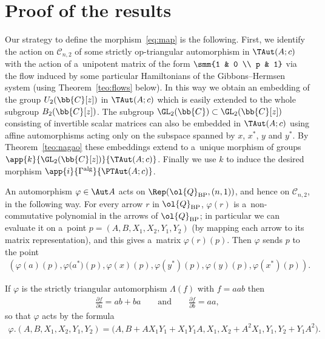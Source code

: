 \section{Proof of the results}

Our strategy to def\/ine the morphism~\eqref{eq:map} is the following.
First, we identify the action on \(\mathcal{C}_{n,2}\) of some strictly op-triangular automorphism in
\(\TAut(A;c)\) with the action of a~unipotent matrix of the form \(\smm{1 & 0
\\ %
p & 1}\) via the f\/low induced by some particular Hamiltonians of the Gibbons--Hermsen system (using
Theorem~\ref{teo:flows} below).
In this way we obtain an embedding of the group \(U_{2}(\bb{C}[z])\) in \(\TAut(A;c)\) which is easily
extended to the whole subgroup \(B_{2}(\bb{C}[z])\).
The subgroup \(\GL_{2}(\bb{C})\subset \GL_{2}(\bb{C}[z])\) consisting of invertible scalar matrices can
also be embedded in \(\TAut(A;c)\) using af\/f\/ine automorphisms acting only on the subspace spanned by
\(x\), \(x^{*}\), \(y\) and \(y^{*}\).
By Theorem~\ref{teo:nagao} these embeddings extend to a~unique morphism of groups
\(\app{k}{\GL_{2}(\bb{C}[z])}{\TAut(A;c)}\).
Finally we use \(k\) to induce the desired morphism \(\app{i}{\Gamma^{\mathrm{alg}}}{\PTAut(A;c)}\).

An automorphism \(\varphi\in \Aut A\) acts on \(\Rep(\ol{Q}_{\mathrm{BP}},(n,1))\), and hence on
\(\mathcal{C}_{n,2}\), in the following way.
For every arrow \(r\) in \(\ol{Q}_{\mathrm{BP}}\), \(\varphi(r)\) is a~non-commutative polynomial in the
arrows of \(\ol{Q}_{\mathrm{BP}}\); in particular we can evaluate it on a~point \(p =
(A,B,X_{1},X_{2},Y_{1},Y_{2})\) (by mapping each arrow to its matrix representation), and this gives
a~matrix \(\varphi(r)(p)\).
Then \(\varphi\) sends \(p\) to the point
\begin{gather}
\label{eq:act-aut}
(\varphi(a)(p),\varphi\big(a^{*}\big)(p),\varphi(x)(p),\varphi(y^{*})(p),\varphi(y)(p),\varphi(x^{*})(p)).
\end{gather}

\begin{example}
If \(\varphi\) is the strictly triangular automorphism \(\Lambda(f)\) with \(f = aab\) then
\begin{gather*}
\frac{\partial f}{\partial a}=ab+ba \qquad \text{and}\qquad \frac{\partial f}{\partial b}=aa,
\end{gather*}
so that \(\varphi\) acts by the formula
\begin{gather*}
\varphi.(A,B,X_{1},X_{2},Y_{1},Y_{2})=\big(A,B+AX_{1}Y_{1}+X_{1}Y_{1}A,X_{1},X_{2}+A^{2}X_{1},Y_{1},Y_{2}
+Y_{1}A^{2}\big).
\end{gather*}
\end{example}

